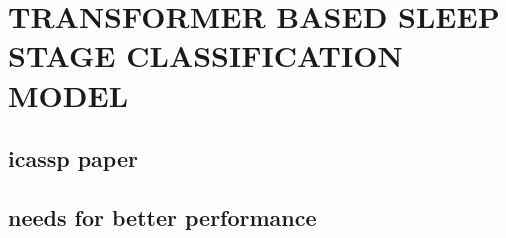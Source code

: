 \chapter{TRANSFORMER BASED SLEEP STAGE CLASSIFICATION MODEL}
\section{icassp paper}
\section{needs for better performance}
